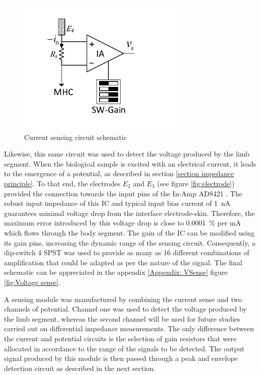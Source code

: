 \begin{figure}[!htpb]
	\centering
	\includegraphics[width=8cm,keepaspectratio]{figure4}
	\caption{Current sensing circuit schematic}
	\label{fig:peak}
\end{figure}

Likewise, this same circuit was used to detect the voltage produced by the limb segment. When the biological sample is excited with an electrical current, it leads to the emergence of a potential, as described in section \ref{section impedance principle}. To that end, the electrodes $E_2$ and $E_3$ (see figure \ref{fig:electrode}) provided the connection towards the input pins of the In-Amp AD8421 \cite{ad:AD8421}. The robust input impedance of this IC and typical input bias current of \SI{1}{\nA} guarantees minimal voltage drop from the interface electrode-skin. Therefore, the maximum error introduced by this voltage drop is close to \SI{0.0001}{\percent} per mA which flows through the body segment. The gain of the IC can be modified using its gain pins, increasing the dynamic range of the sensing circuit. Consequently, a dip-switch 4 SPST was used to provide as many as 16 different combinations of amplification that could be adapted as per the nature of the signal. The final schematic can be appreciated in the appendix \ref{Appendix: VSense} figure \ref{fig:Voltage sense}.

A sensing module was manufactured by combining the current sense and two channels of potential. Channel one was used to detect the voltage produced by the limb segment, whereas the second channel will be used for future studies carried out on differential impedance measurements. The only difference between the current and potential circuits is the selection of gain resistors that were allocated in accordance to the range of the signals to be detected. The output signal produced by this module is then passed through a peak and envelope detection circuit as described in the next section. 

